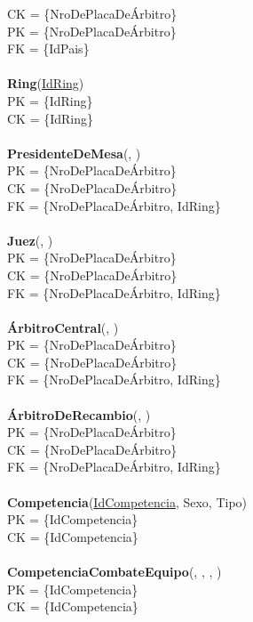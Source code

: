 CK = \{NroDePlacaDeÁrbitro\}\\
PK = \{NroDePlacaDeÁrbitro\}\\
FK = \{IdPais\}\\
\\
\textbf{Ring}(\uline{IdRing})\\
PK = \{IdRing\}\\
CK = \{IdRing\}\\
\\
\textbf{PresidenteDeMesa}(, )\\
PK = \{NroDePlacaDeÁrbitro\}\\
CK = \{NroDePlacaDeÁrbitro\}\\
FK = \{NroDePlacaDeÁrbitro, IdRing\}\\
\\
\textbf{Juez}(, )\\
PK = \{NroDePlacaDeÁrbitro\}\\
CK = \{NroDePlacaDeÁrbitro\}\\
FK = \{NroDePlacaDeÁrbitro, IdRing\}\\
\\
\textbf{ÁrbitroCentral}(, )\\
PK = \{NroDePlacaDeÁrbitro\}\\
CK = \{NroDePlacaDeÁrbitro\}\\
FK = \{NroDePlacaDeÁrbitro, IdRing\}\\
\\
\textbf{ÁrbitroDeRecambio}(, )\\
PK = \{NroDePlacaDeÁrbitro\}\\
CK = \{NroDePlacaDeÁrbitro\}\\
FK = \{NroDePlacaDeÁrbitro, IdRing\}\\
\\
\textbf{Competencia}(\uline{IdCompetencia}, Sexo, Tipo)\\
PK = \{IdCompetencia\}\\
CK = \{IdCompetencia\}\\
\\
\textbf{CompetenciaCombateEquipo}(, , , )\\
PK = \{IdCompetencia\}\\
CK = \{IdCompetencia\}\\
